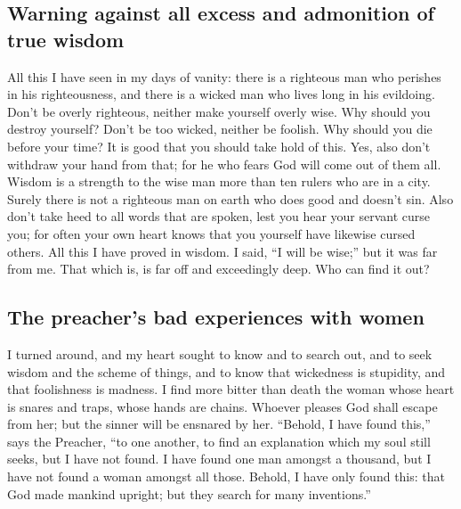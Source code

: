\hypertarget{warning-against-all-excess-and-admonition-of-true-wisdom}{%
\subsection{Warning against all excess and admonition of true
wisdom}\label{warning-against-all-excess-and-admonition-of-true-wisdom}}

 All this I have seen in my days of vanity: there is a
righteous man who perishes in his righteousness, and there is a wicked
man who lives long in his evildoing.  Don't be overly
righteous, neither make yourself overly wise. Why should you destroy
yourself?  Don't be too wicked, neither be foolish. Why
should you die before your time?  It is good that you
should take hold of this. Yes, also don't withdraw your hand from that;
for he who fears God will come out of them all.  Wisdom
is a strength to the wise man more than ten rulers who are in a city.
 Surely there is not a righteous man on earth who does
good and doesn't sin.  Also don't take heed to all words
that are spoken, lest you hear your servant curse you; 
for often your own heart knows that you yourself have likewise cursed
others.  All this I have proved in wisdom. I said, ``I
will be wise;'' but it was far from me.  That which is,
is far off and exceedingly deep. Who can find it out?

\hypertarget{the-preachers-bad-experiences-with-women}{%
\subsection{The preacher's bad experiences with
women}\label{the-preachers-bad-experiences-with-women}}

 I turned around, and my heart sought to know and to
search out, and to seek wisdom and the scheme of things, and to know
that wickedness is stupidity, and that foolishness is madness.
 I find more bitter than death the woman whose heart is
snares and traps, whose hands are chains. Whoever pleases God shall
escape from her; but the sinner will be ensnared by her. 
``Behold, I have found this,'' says the Preacher, ``to one another, to
find an explanation  which my soul still seeks, but I
have not found. I have found one man amongst a thousand, but I have not
found a woman amongst all those.  Behold, I have only
found this: that God made mankind upright; but they search for many
inventions.''

